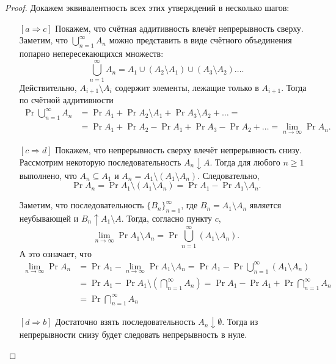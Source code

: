 \begin{proof}
	Докажем эквивалентность всех этих утверждений в несколько шагов:
	
	\begin{itemize}
		\item[{\([a \Rightarrow c]\)}] Покажем, что счётная аддитивность влечёт непрерывность сверху. Заметим, что \(\bigcup_{n = 1}^{\infty} A_n\) можно представить в виде счётного объединения попарно непересекающихся множеств:
		\[
		\bigcup\limits_{n = 1}^{\infty} A_n = A_1 \cup (A_2\setminus A_1) \cup (A_3\setminus A_2)\ldots.
		\]
		Действительно, \(A_{i+1} \setminus A_i\) содержит элементы, лежащие только в \(A_{i+1}\). Тогда по счётной аддитивности
		\begin{align}
			\Pr{\bigcup\limits_{n = 1}^{\infty} A_n} &=
			\Pr{A_1} + \Pr{A_2\setminus A_1} + \Pr{A_3\setminus A_2} + \ldots =\\
			&= \Pr{A_1} + \Pr{A_2} - \Pr{A_1} + \Pr{A_3} -\Pr{A_2} + \ldots =
			\lim\limits_{n \to \infty} \Pr{A_n}.
		\end{align}
		
		\item[{\([c \Rightarrow d]\)}] Покажем, что непрерывность сверху влечёт непрерывность снизу. Рассмотрим некоторую последовательность \(A_n \downarrow
		A\). Тогда для любого \(n \geq 1\) выполнено, что \(A_n \subseteq A_1\) и \(A_n = A_1 \setminus (A_1 \setminus A_n)\). Следовательно,
		\[
		\Pr{A_n} = \Pr{A_1 \setminus(A_1\setminus A_n)} = \Pr{A_1} - \Pr{A_1\setminus A_n}.
		\]
		
		Заметим, что последовательность \(\{B_n\}_{n = 1}^{\infty}\), где \(B_n = A_1 \setminus A_n\) является неубывающей и \(B_n \uparrow A_1 \setminus A\). Тогда, согласно пункту \(c\),
		\[
		\lim\limits_{n \to \infty}\Pr{A_1\setminus A_n} = \Pr{\bigcup\limits_{n=1}^{\infty}(A_1\setminus A_n)}.
		\]
		А это означает, что
		\begin{align}
			\lim\limits_{n \to \infty} \Pr{A_n} &= \Pr{A_1} - \lim\limits_{n \to \infty}\Pr{A_1\setminus A_n} = \Pr{A_1} - \Pr{\bigcup\limits_{n=1}^{\infty}(A_1\setminus A_n)} \\
			&= \Pr{A_1} - \Pr{A_1 \setminus \left(\bigcap\limits_{n=1}^{\infty} A_n\right)} = \Pr{A_1} - \Pr{A_1} + \Pr{\bigcap\limits_{n=1}^{\infty} A_n} \\
			&= \Pr{\bigcap\limits_{n=1}^{\infty} A_n}
		\end{align}
		
		\item[{\([d \Rightarrow b]\)}] Достаточно взять последовательность \(A_n \downarrow \emptyset\). Тогда из непрерывности снизу будет следовать непрерывность в нуле.
		

\end{itemize}
\end{proof}

